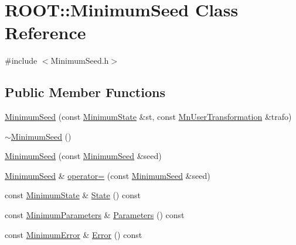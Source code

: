 \hypertarget{classROOT_1_1Minuit2_1_1MinimumSeed}{}\section{R\+O\+OT\+:\+:Minimum\+Seed Class Reference}
\label{classROOT_1_1Minuit2_1_1MinimumSeed}


{\ttfamily \#include $<$Minimum\+Seed.\+h$>$}

\subsection*{Public Member Functions}
\begin{DoxyCompactItemize}
\item 
\mbox{\hyperlink{classROOT_1_1Minuit2_1_1MinimumSeed_a0d3070cfaa1be8ce9e9e64f39a30b875}{Minimum\+Seed}} (const \mbox{\hyperlink{classROOT_1_1Minuit2_1_1MinimumState}{Minimum\+State}} \&st, const \mbox{\hyperlink{classROOT_1_1Minuit2_1_1MnUserTransformation}{Mn\+User\+Transformation}} \&trafo)
\item 
\mbox{\hyperlink{classROOT_1_1Minuit2_1_1MinimumSeed_a99b95b10842f335d10bf7293f7d91b92}{$\sim$\+Minimum\+Seed}} ()
\item 
\mbox{\hyperlink{classROOT_1_1Minuit2_1_1MinimumSeed_a720f1ac742c7c9c8425bad7b4dc7dd12}{Minimum\+Seed}} (const \mbox{\hyperlink{classROOT_1_1Minuit2_1_1MinimumSeed}{Minimum\+Seed}} \&seed)
\item 
\mbox{\hyperlink{classROOT_1_1Minuit2_1_1MinimumSeed}{Minimum\+Seed}} \& \mbox{\hyperlink{classROOT_1_1Minuit2_1_1MinimumSeed_a0ec0790834635093f5b3cffa976efe60}{operator=}} (const \mbox{\hyperlink{classROOT_1_1Minuit2_1_1MinimumSeed}{Minimum\+Seed}} \&seed)
\item 
const \mbox{\hyperlink{classROOT_1_1Minuit2_1_1MinimumState}{Minimum\+State}} \& \mbox{\hyperlink{classROOT_1_1Minuit2_1_1MinimumSeed_a732476aa579a27366511684213835a2e}{State}} () const
\item 
const \mbox{\hyperlink{classROOT_1_1Minuit2_1_1MinimumParameters}{Minimum\+Parameters}} \& \mbox{\hyperlink{classROOT_1_1Minuit2_1_1MinimumSeed_a994d60b61e96fefc68cbccab8f82794d}{Parameters}} () const
\item 
const \mbox{\hyperlink{classROOT_1_1Minuit2_1_1MinimumError}{Minimum\+Error}} \& \mbox{\hyperlink{classROOT_1_1Minuit2_1_1MinimumSeed_a19cc15c1feb45267a1a8b2cdb4f25ac2}{Error}} () const
\item 

\end{DoxyCompactItemize}
